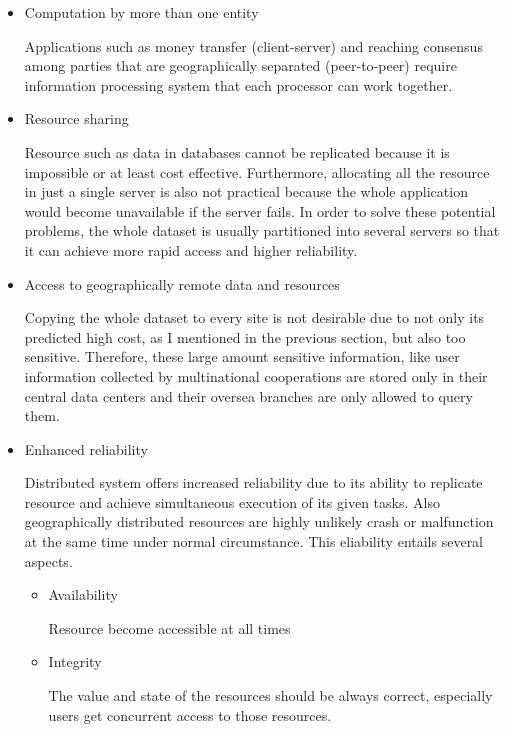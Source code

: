\begin{itemize}
 
     \item{Computation by more than one entity}
     
     Applications such as money transfer (client-server) and reaching consensus among parties that are geographically separated (peer-to-peer) require information processing system that each processor can work together.
     
     \item{Resource sharing}
     
     Resource such as data in databases cannot be replicated because it is impossible or at least cost effective. Furthermore, allocating all the resource in just a single server is also not practical because the whole application would become unavailable if the server fails.  In order to solve these potential problems, the whole dataset is usually partitioned into several servers so that it can achieve more rapid access and higher reliability.
     
     \item{Access to geographically remote data and resources}
     
     Copying the whole dataset to every site is not desirable due to not only its predicted high cost, as I mentioned in the previous section, but also too sensitive.  Therefore, these large amount sensitive information, like user information collected by multinational cooperations are stored only in their central data centers and their oversea branches are only allowed to query them.
     
     \item{Enhanced reliability}
     
     Distributed system offers increased reliability due to its ability to replicate resource and achieve simultaneous execution of its given tasks. Also geographically distributed resources are highly unlikely crash or malfunction at the same time under normal circumstance.   This eliability entails several aspects.
     
     \begin{itemize}
     
      	\item{Availability}
	
	Resource become accessible at all times
	
      	\item{Integrity}
	
	The value and state of the resources should be always correct, especially users get concurrent access to those resources.	
	

\end{itemize}
\end{itemize}
